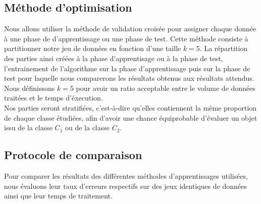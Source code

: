\documentclass[a4paper,10pt]{article}
\begin{document}
	\subsection{Méthode d'optimisation}
		Nous allons utiliser la méthode de validation croisée pour assigner chaque donnée à une phase de d'apprentissage ou une phase de test. Cette méthode consiste à partitionner notre jeu de données en fonction d'une taille $k=5$. La répartition des parties ainsi créées à la phase d'apprentisage ou à la phase de test, l'entrainement de l'algorithme sur la phase d'apprentissage puis sur la phase de test pour laquelle nous comparerons les résultats obtenus aux résultats attendus. \\
		Nous définissons $k=5$ pour avoir un ratio acceptable entre le volume de données traitées et le temps d'éxecution.\\
		Nos parties seront stratifiées, c'est-à-dire qu'elles contiennent la même proportion de chaque classe étudiées, afin d'avoir une chance équiprobable d'évaluer un objet issu de la classe $C_1$ ou de la classe $C_2$.

	\subsection{Protocole de comparaison}
		Pour comparer les résultats des différentes méthodes d'apprentissages utilisées, nous évaluons leur taux d’erreurs respectifs sur des jeux identiques de données ainsi que leur temps de traitement.
\end{document}
